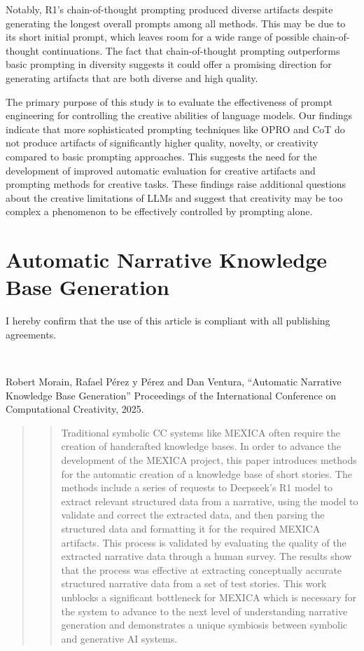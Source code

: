 \documentclass[phd,electronic,oneside,twosidetoc,letterpaper,chaptercenter,parttop,lof]{byumsphd}
\begin{document}
Notably, R1’s chain-of-thought prompting produced diverse artifacts despite generating the longest overall prompts among all methods. This may be due to its short initial prompt, which leaves room for a wide range of possible chain-of-thought continuations. The fact that chain-of-thought prompting outperforms basic prompting in diversity suggests it could offer a promising direction for generating artifacts that are both diverse and high quality.

The primary purpose of this study is to evaluate the effectiveness of prompt engineering for controlling the creative abilities of language models. Our findings indicate that more sophisticated prompting techniques like OPRO and CoT do not produce artifacts of significantly higher quality, novelty, or creativity compared to basic prompting approaches. This suggests the need for the development of improved automatic evaluation for creative artifacts and prompting methods for creative tasks. These findings raise additional questions about the creative limitations of LLMs and suggest that creativity may be too complex a phenomenon to be effectively controlled by prompting alone.

\chapter{Automatic Narrative Knowledge Base Generation}
\label{chap:llmexica}

I hereby confirm that the use of this article is compliant with all publishing agreements.

\

\noindent
Robert Morain, Rafael Pérez y Pérez and Dan Ventura, ``Automatic Narrative Knowledge Base Generation'' Proceedings of the International Conference on Computational Creativity, 2025.

\begin{abstract}
\begin{quote}

Traditional symbolic CC systems like MEXICA often require the creation of handcrafted knowledge bases. In order to advance the development of the MEXICA project, this paper introduces methods for the automatic creation of a knowledge base of short stories. The methods include a series of requests to Deepseek's R1 model to extract relevant structured data from a narrative, using the model to validate and correct the extracted data, and then parsing the structured data and formatting it for the required MEXICA artifacts. This process is validated by evaluating the quality of the extracted narrative data through a human survey. The results show that the process was effective at extracting conceptually accurate structured narrative data from a set of test stories. This work unblocks a significant bottleneck for MEXICA which is necessary for the system to advance to the next level of understanding narrative generation and demonstrates a unique symbiosis between symbolic and generative AI systems.

\end{quote}
\end{abstract}
\end{document}
